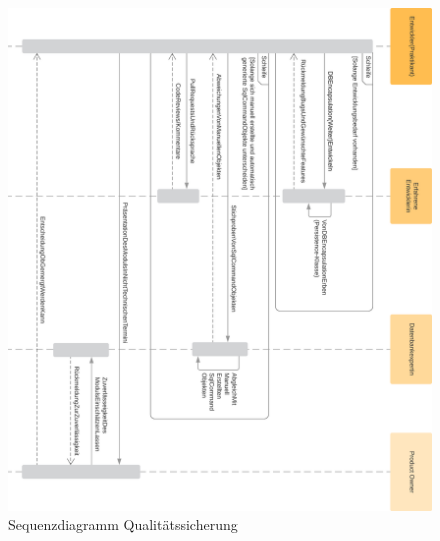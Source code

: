 \documentclass[11pt,toc=sectionentrywithoutdots, 
headheight=44pt, headings=optiontoheadandtoc, hyperfootnotes=false, hypertexnames=false]{scrartcl}
\begin{document}
 \begin{figure}[H]
 \centering
	\includegraphics[scale=0.85]{Einfaches Sequenzdiagramm_2.png}
	 \caption{Sequenzdiagramm Qualitätssicherung}
\end{figure}%
\end{document}

